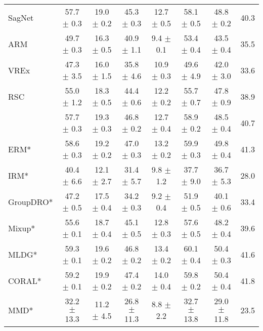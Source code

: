 \begin{table*}
\begin{center}
\begin{tabular}{lccccccc}
SagNet               & 57.7 $\pm$ 0.3       & 19.0 $\pm$ 0.2       & 45.3 $\pm$ 0.3       & 12.7 $\pm$ 0.5       & 58.1 $\pm$ 0.5       & 48.8 $\pm$ 0.2       & 40.3                 \\
ARM                  & 49.7 $\pm$ 0.3       & 16.3 $\pm$ 0.5       & 40.9 $\pm$ 1.1       & 9.4 $\pm$ 0.1        & 53.4 $\pm$ 0.4       & 43.5 $\pm$ 0.4       & 35.5                 \\
VREx                 & 47.3 $\pm$ 3.5       & 16.0 $\pm$ 1.5       & 35.8 $\pm$ 4.6       & 10.9 $\pm$ 0.3       & 49.6 $\pm$ 4.9       & 42.0 $\pm$ 3.0       & 33.6                 \\
RSC                   & 55.0 $\pm$ 1.2       & 18.3 $\pm$ 0.5       & 44.4 $\pm$ 0.6       & 12.2 $\pm$ 0.2       & 55.7 $\pm$ 0.7       & 47.8 $\pm$ 0.9       & 38.9                 \\
\divcams 	        & 57.7 $\pm$ 0.3       & 19.3 $\pm$ 0.3        & 46.8 $\pm$ 0.2       & 12.7 $\pm$ 0.4        & 58.9 $\pm$ 0.2	    & 48.5 $\pm$ 0.4     & 40.7                 \\
\midrule
ERM*                  & 58.6 $\pm$ 0.3       & 19.2 $\pm$ 0.2       & 47.0 $\pm$ 0.3       & 13.2 $\pm$ 0.2       & 59.9 $\pm$ 0.3       & 49.8 $\pm$ 0.4       & 41.3                 \\
IRM*                  & 40.4 $\pm$ 6.6       & 12.1 $\pm$ 2.7       & 31.4 $\pm$ 5.7       & 9.8 $\pm$ 1.2        & 37.7 $\pm$ 9.0       & 36.7 $\pm$ 5.3       & 28.0                 \\
GroupDRO*             & 47.2 $\pm$ 0.5       & 17.5 $\pm$ 0.4       & 34.2 $\pm$ 0.3       & 9.2 $\pm$ 0.4        & 51.9 $\pm$ 0.5       & 40.1 $\pm$ 0.6       & 33.4                 \\
Mixup*                & 55.6 $\pm$ 0.1       & 18.7 $\pm$ 0.4       & 45.1 $\pm$ 0.5       & 12.8 $\pm$ 0.3       & 57.6 $\pm$ 0.5       & 48.2 $\pm$ 0.4       & 39.6                 \\
MLDG*                 & 59.3 $\pm$ 0.1       & 19.6 $\pm$ 0.2       & 46.8 $\pm$ 0.2       & 13.4 $\pm$ 0.2       & 60.1 $\pm$ 0.4       & 50.4 $\pm$ 0.3       & 41.6                 \\
CORAL*                & 59.2 $\pm$ 0.1       & 19.9 $\pm$ 0.2       & 47.4 $\pm$ 0.2       & 14.0 $\pm$ 0.4       & 59.8 $\pm$ 0.2       & 50.4 $\pm$ 0.4       & 41.8                 \\
MMD*                  & 32.2 $\pm$ 13.3      & 11.2 $\pm$ 4.5       & 26.8 $\pm$ 11.3      & 8.8 $\pm$ 2.2        & 32.7 $\pm$ 13.8      & 29.0 $\pm$ 11.8      & 23.5                 \\

\end{tabular}
\end{center}
\end{table*}
